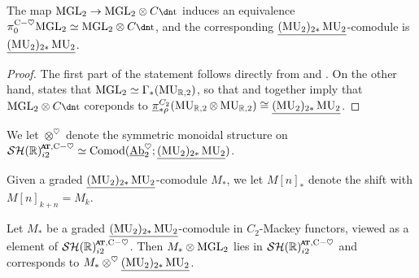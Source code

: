\begin{prop} \label{prop:MGL-Cta}
  The map $\MGL_2 \to \MGL_2 \otimes C\ta$ induces an equivalence $\pi_0 ^{\ch} \MGL_2 \simeq \MGL_2 \otimes C\ta$, and the corresponding $\underline{(\operatorname{\mathrm{MU}}_2)_{2*} \operatorname{\mathrm{MU}}_2}$-comodule is $\underline{(\operatorname{\mathrm{MU}}_2)_{2*} \operatorname{\mathrm{MU}}_2}$.
\end{prop}

\begin{proof}
  The first part of the statement follows directly from  and .
  On the other hand,  states that $\mathrm{MGL}_2 \simeq \Gamma_* (\operatorname{\mathrm{MU}}_{\mathbb{R},2})$, so that  and  together imply that $\MGL_2 \otimes C\ta$ coreponds to $\underline{\pi}_{*\rho} ^{C_2} (\operatorname{\mathrm{MU}}_{\mathbb{R},2} \otimes \operatorname{\mathrm{MU}}_{\mathbb{R},2}) \cong \underline{(\operatorname{\mathrm{MU}}_2)_{2*} \operatorname{\mathrm{MU}}_2}$.
\end{proof}

\begin{ntn}
  We let $\otimes^{\heartsuit}$ denote the symmetric monoidal structure on $\SHRatch \simeq \Comod(\uAbh_2; \underline{(\MU_2)_{2*} \MU_2})$.

  Given a graded $\underline{(\operatorname{\mathrm{MU}}_2)_{2*} \operatorname{\mathrm{MU}}_2}$-comodule $M_*$, we let $M[n]_*$ denote the shift with $M[n]_{k+n} = M_{k}$.
\end{ntn}

\begin{lem} \label{lem:MGL-heart-tensor}
  Let $M_*$ be a graded $\underline{(\operatorname{\mathrm{MU}}_2)_{2*} \operatorname{\mathrm{MU}}_2}$-comodule in $C_2$-Mackey functors, viewed as a element of $\SHRatch$.
  Then $M_* \otimes \mathrm{MGL}_2$ lies in $\SHRatch$ and corresponds to $M_* \otimes^{\heartsuit} \underline{(\operatorname{\mathrm{MU}}_2)_{2*} \operatorname{\mathrm{MU}}_2}$.
\end{lem}

